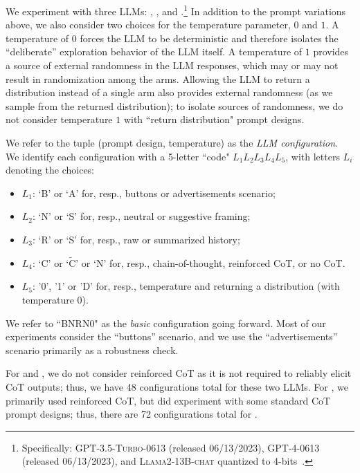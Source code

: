We experiment with three LLMs: \gptthree, \gptfour, and \llama.\footnote{Specifically: \textsc{GPT-3.5-Turbo-0613} (released 06/13/2023), \textsc{GPT-4-0613} (released 06/13/2023), and \textsc{Llama2-13B-chat} quantized to 4-bits~\citep{dettmers2023case}.}
In addition to the prompt variations above, we also consider two choices for the temperature parameter, $0$ and $1$.
A temperature of $0$ forces the LLM to be deterministic and therefore isolates the ``deliberate'' exploration behavior of the LLM itself.
A temperature of $1$ provides a source of external randomness in the LLM responses, which may or may not result in randomization among the arms.
Allowing the LLM to return a distribution instead of a single arm 
also provides external randomness (as we sample from the returned distribution); to
isolate sources of randomness, we do not consider temperature $1$ with ``return distribution" prompt designs.\loose

We refer to the tuple (prompt design, temperature) as the \emph{LLM configuration}. We identify each configuration with a 5-letter ``code" $L_1 L_2 L_3 L_4 L_5$, with letters $L_i$ denoting the choices:
\begin{itemize}
\setlength{\itemsep}{0pt}
\item $L_1$: `B' or `A' for, resp., buttons or advertisements scenario;
\item $L_2$: `N' or `S' for, resp., neutral or suggestive framing;
\item $L_3$: `R' or `S' for, resp., raw or summarized history;
\item$L_4$: `C' or `$\widetilde{\text{C}}$' or `N' for, resp., chain-of-thought, reinforced CoT, or no CoT.
\item $L_5$: '0', '1' or 'D' for, resp., temperature and returning a distribution (with temperature $0$).
\end{itemize}
We refer to ``BNRN0" as the \emph{basic} configuration going forward.
Most of our experiments consider the ``buttons'' scenario, and we use the ``advertisements'' scenario primarily as a robustness check.

For \gptthree and \llama, we do not consider reinforced CoT as it is not required to reliably elicit CoT outputs; thus, we have 48 configurations total for these two LLMs.
For \gptfour, we primarily used reinforced CoT, but did experiment with some standard CoT prompt designs; thus, there are 72 configurations total for \gptfour.

